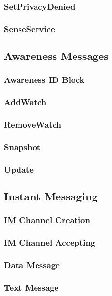\documentclass[titlepage,oneside]{book}
\begin{document}
\subsubsection{SetPrivacyDenied}
\subsubsection{SenseService}

\subsection{Awareness Messages}
\subsubsection{Awareness ID Block}
\subsubsection{AddWatch}
\subsubsection{RemoveWatch}
\subsubsection{Snapshot}
\subsubsection{Update}

\subsection{Instant Messaging}
\subsubsection{IM Channel Creation}
\subsubsection{IM Channel Accepting}
\subsubsection{Data Message}
\subsubsection{Text Message}

\subsection{}
\end{document}
